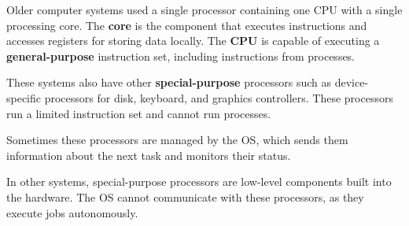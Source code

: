 \documentclass{article}
\begin{document}
Older computer systems used a single processor containing one CPU with
a single processing core. The \textbf{core} is the component that
executes instructions and accesses registers for storing data locally.
The \textbf{CPU} is capable of executing a \textbf{general-purpose}
instruction set, including instructions from processes.

These systems also have other \textbf{special-purpose} processors such
as device-specific processors for disk, keyboard, and graphics
controllers. These processors run a limited instruction set and cannot
run processes.

Sometimes these processors are managed by the OS, which sends them
information about the next task and monitors their status.

In other systems, special-purpose processors are low-level components
built into the hardware. The OS cannot communicate with these
processors, as they execute jobs autonomously.
\end{document}
